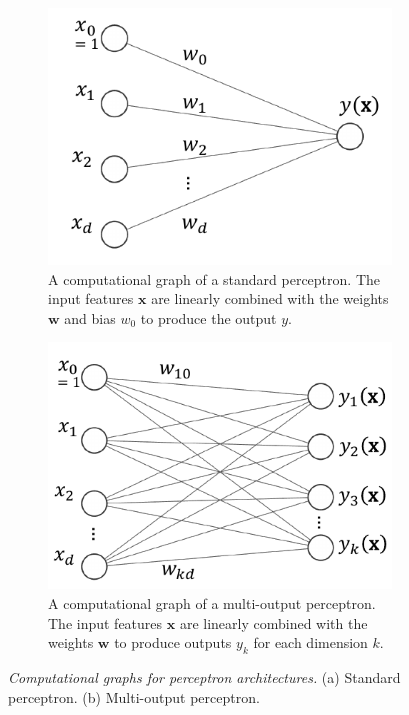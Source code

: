 \begin{figure}[h]
    \centering
    \begin{subfigure}[b]{0.45\linewidth}
        \centering
        \includegraphics[width=\linewidth]{images/nn_perceptron.pdf}
        \caption{A computational graph of a standard perceptron. The input features $\mathbf{x}$ are linearly combined with the weights $\mathbf{w}$ and bias $w_0$ to produce the output $y$.}
        \label{fig:nn-perceptron}
    \end{subfigure}
    \hfill
    \begin{subfigure}[b]{0.45\linewidth}
        \centering
        \includegraphics[width=\linewidth]{images/nn_multiclass.pdf}
        \caption{A computational graph of a multi-output perceptron. The input features $\mathbf{x}$ are linearly combined with the weights $\mathbf{w}$ to produce outputs $y_k$ for each dimension $k$.}
        \label{fig:nn-multiclass}
    \end{subfigure}
    \caption{\textit{Computational graphs for perceptron architectures.} (a) Standard perceptron. (b) Multi-output perceptron.}
    \label{fig:nn-combined}
\end{figure}

